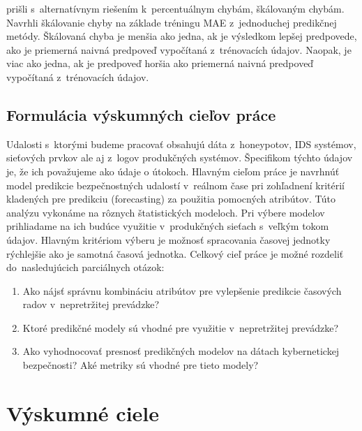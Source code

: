\documentclass[thesismargins, thesislinespacing, openright, upjsfrontpage]{rnthesis}
\begin{document}
\cite{hyndman2006another} prišli s~alternatívnym riešením k~percentuálnym chybám, škálovaným chybám. Navrhli škálovanie chyby na základe tréningu MAE z~jednoduchej predikčnej metódy. Škálovaná chyba je menšia ako jedna, ak je výsledkom lepšej predpovede, ako je priemerná naivná predpoveď vypočítaná z~trénovacích údajov. Naopak, je viac ako jedna, ak je predpoveď horšia ako priemerná naivná predpoveď vypočítaná z~trénovacích údajov.

\section{Formulácia výskumných cieľov práce}

Udalosti s~ktorými budeme pracovať obsahujú dáta z~honeypotov, IDS systémov, sieťových prvkov ale aj z~logov produkčných systémov. Špecifikom týchto údajov je, že ich považujeme ako údaje o útokoch. Hlavným cieľom práce je navrhnúť model predikcie bezpečnostných udalostí v~reálnom čase pri zohľadnení kritérií kladených pre predikciu (forecasting) za použitia pomocných atribútov. Túto analýzu vykonáme na rôznych štatistických modeloch. Pri výbere modelov prihliadame na ich budúce využitie v~produkčných sieťach s~veľkým tokom údajov. Hlavným kritériom výberu je možnosť spracovania časovej jednotky rýchlejšie ako je samotná časová jednotka. Celkový cieľ práce je možné rozdeliť do~nasledujúcich parciálnych otázok:

\begin{enumerate}
  \item Ako nájsť správnu kombináciu atribútov pre vylepšenie predikcie časových radov v~nepretržitej prevádzke?
  \item Ktoré predikčné modely sú vhodné pre využitie v~nepretržitej prevádzke?
  \item Ako vyhodnocovať presnosť predikčných modelov na dátach kybernetickej bezpečnosti? Aké metriky sú vhodné pre tieto modely?
\end{enumerate}

\chapter{Výskumné ciele}
\end{document}

